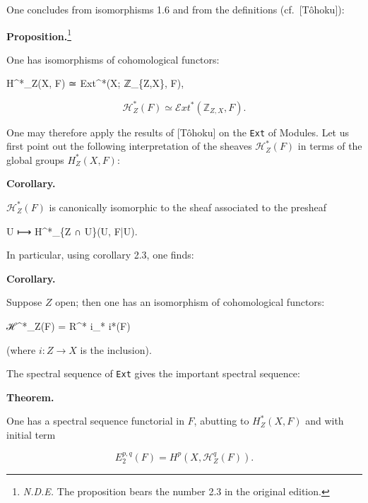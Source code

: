 \documentclass[
]{article}
\newenvironment{Shaded}{}{}
\newcommand{\NormalTok}[1]{#1}
\begin{document}
One concludes from isomorphisms 1.6 and from the definitions
(cf.~{[}Tôhoku{]}):

\textbf{Proposition.}\footnote{\emph{N.D.E.} The proposition bears the
  number 2.3 in the original edition.}

One has isomorphisms of cohomological functors:

\begin{Shaded}
\begin{Highlighting}[]
\NormalTok{H\^{}*\_Z(X, F) ≃ Ext\^{}*(X; ℤ\_\{Z,X\}, F),}
\end{Highlighting}
\end{Shaded}

\[
\mathcal{H}^{*}_{Z}(F) \simeq \mathcal{E}xt^{*}(\mathbb{Z}_{Z,X}, F).
\]

One may therefore apply the results of {[}Tôhoku{]} on the \texttt{Ext}
of Modules. Let us first point out the following interpretation of the
sheaves \(\mathcal{H}^{*}_{Z}(F)\) in terms of the global groups
\(H^{*}_{Z}(X, F)\):

\textbf{Corollary.}

\(\mathcal{H}^{*}_{Z}(F)\) is canonically isomorphic to the sheaf
associated to the presheaf

\begin{Shaded}
\begin{Highlighting}[]
\NormalTok{U ⟼ H\^{}*\_\{Z ∩ U\}(U, F|U).}
\end{Highlighting}
\end{Shaded}

In particular, using corollary 2.3, one finds:

\textbf{Corollary.}

Suppose \(Z\) open; then one has an isomorphism of cohomological
functors:

\begin{Shaded}
\begin{Highlighting}[]
\NormalTok{ℋ\^{}*\_Z(F) = R\^{}* i\_* i*(F)}
\end{Highlighting}
\end{Shaded}

(where \(i: Z \to X\) is the inclusion).

The spectral sequence of \texttt{Ext} gives the important spectral
sequence:

\textbf{Theorem.}

One has a spectral sequence functorial in \(F\), abutting to
\(H^{*}_{Z}(X, F)\) and with initial term

\[
E^{p,q}_{2}(F) = H^{p}(X, \mathcal{H}^{q}_{Z}(F)).
\]
\end{document}
